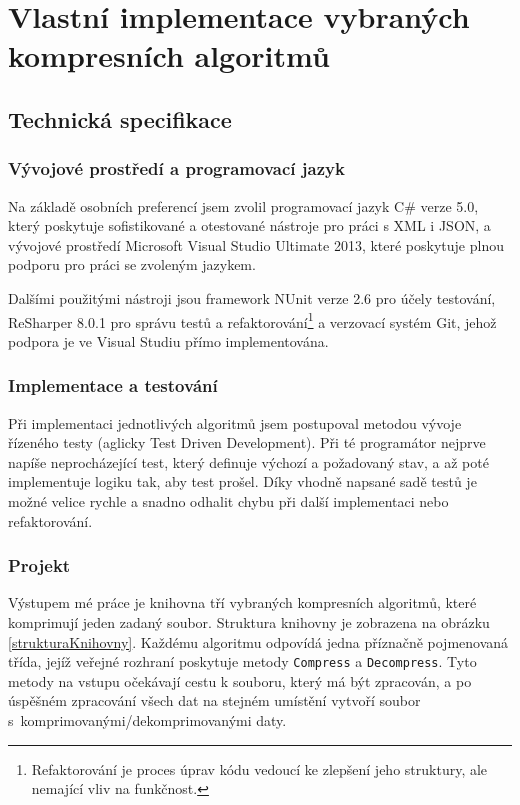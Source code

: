 \chapter{Vlastní implementace vybraných kompresních algoritmů}

\section{Technická specifikace}
\subsection{Vývojové prostředí a programovací jazyk}
Na základě osobních preferencí jsem zvolil programovací jazyk C\# verze 5.0, který poskytuje sofistikované a otestované nástroje pro práci s XML i JSON, a vývojové prostředí Microsoft Visual Studio Ultimate 2013, které poskytuje plnou podporu pro práci se zvoleným jazykem.

Dalšími použitými nástroji jsou framework NUnit verze 2.6 pro účely testování, ReSharper 8.0.1 pro správu testů a refaktorování\footnote{Refaktorování je proces úprav kódu vedoucí ke zlepšení jeho struktury, ale nemající vliv na funkčnost.} a verzovací systém Git, jehož podpora je ve Visual Studiu přímo implementována.

\subsection{Implementace a testování}
Při implementaci jednotlivých algoritmů jsem postupoval metodou vývoje řízeného testy (aglicky Test Driven Development). Při té programátor nejprve napíše neprocházející test, který definuje výchozí a požadovaný stav, a až poté implementuje logiku tak, aby test prošel. Díky vhodně napsané sadě testů je možné velice rychle a snadno odhalit chybu při další implementaci nebo refaktorování.

\subsection{Projekt}
Výstupem mé práce je knihovna tří vybraných kompresních algoritmů, které komprimují jeden zadaný soubor. Struktura knihovny je zobrazena na obrázku \ref{strukturaKnihovny}. Každému algoritmu odpovídá jedna příznačně pojmenovaná třída, jejíž veřejné rozhraní poskytuje metody \texttt{Compress} a \texttt{Decompress}. Tyto metody na vstupu očekávají cestu k souboru, který má být zpracován, a po úspěšném zpracování všech dat na stejném umístění vytvoří soubor s~komprimovanými/dekomprimovanými daty.

